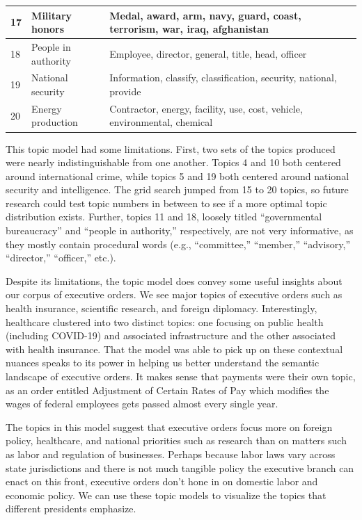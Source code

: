 \documentclass{article}
\begin{document}
{{\begin{table}[H]
\begin{tabular}{lll}
		\midrule
		17 & Military honors & Medal, award, arm, navy, guard, coast, terrorism, war, iraq, afghanistan\\
		\midrule
		18 & People in authority & Employee, director, general, title, head, officer\\
		\midrule
		19 & National security & Information, classify, classification, security, national, provide\\
		\midrule
		20 & Energy production & Contractor, energy, facility, use, cost, vehicle, environmental, chemical\\
		\bottomrule
	\end{tabular}
\end{table}

This topic model had some limitations. First, two sets of the topics produced were nearly indistinguishable from one another. Topics 4 and 10 both centered around international crime, while topics 5 and 19 both centered around national security and intelligence. The grid search jumped from 15 to 20 topics, so future research could test topic numbers in between to see if a more optimal topic distribution exists. Further, topics 11 and 18, loosely titled “governmental bureaucracy” and “people in authority,” respectively, are not very informative, as they mostly contain procedural words (e.g., “committee,” “member,” “advisory,” “director,” “officer,” etc.). 

Despite its limitations, the topic model does convey some useful insights about our corpus of executive orders. We see major topics of executive orders such as health insurance, scientific research, and foreign diplomacy. Interestingly, healthcare clustered into two distinct topics: one focusing on public health (including COVID-19) and associated infrastructure and the other associated with health insurance. That the model was able to pick up on these contextual nuances speaks to its power in helping us better understand the semantic landscape of executive orders. It makes sense that payments were their own topic, as an order entitled Adjustment of Certain Rates of Pay which modifies the wages of federal employees gets passed almost every single year. 

The topics in this model suggest that executive orders focus more on foreign policy, healthcare, and national priorities such as research than on matters such as labor and regulation of businesses. Perhaps because labor laws vary across state jurisdictions and there is not much tangible policy the executive branch can enact on this front, executive orders don’t hone in on domestic labor and economic policy. We can use these topic models to visualize the topics that different presidents emphasize. 

}}
\end{document}
